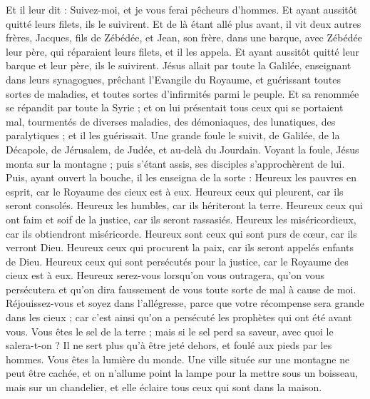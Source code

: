 \begin{multicols}{2}
Et il leur dit : Suivez-moi, et je vous ferai pêcheurs d'hommes.
Et ayant aussitôt quitté leurs filets, ils le suivirent.
Et de là étant allé plus avant, il vit deux autres frères, Jacques, fils de Zébédée, et Jean, son frère, dans une barque, avec Zébédée leur père, qui réparaient leurs filets, et il les appela.
Et ayant aussitôt quitté leur barque et leur père, ils le suivirent.
Jésus allait par toute la Galilée, enseignant dans leurs synagogues, prêchant l'Evangile du Royaume, et guérissant toutes sortes de maladies, et toutes sortes d'infirmités parmi le peuple.
Et sa renommée se répandit par toute la Syrie ; et on lui présentait tous ceux qui se portaient mal, tourmentés de diverses maladies, des démoniaques, des lunatiques, des paralytiques ; et il les guérissait.
Une grande foule le suivit, de Galilée, de la Décapole, de Jérusalem, de Judée, et au-delà du Jourdain.
\VerseOne{}Voyant la foule, Jésus monta sur la montagne ; puis s'étant assis, ses disciples s'approchèrent de lui.
Puis, ayant ouvert la bouche, il les enseigna de la sorte :
Heureux les pauvres en esprit, car le Royaume des cieux est à eux.
Heureux ceux qui pleurent, car ils seront consolés.
Heureux les humbles, car ils hériteront la terre.
Heureux ceux qui ont faim et soif de la justice, car ils seront rassasiés.
Heureux les miséricordieux, car ils obtiendront miséricorde.
Heureux sont ceux qui sont purs de cœur, car ils verront Dieu.
Heureux ceux qui procurent la paix, car ils seront appelés enfants de Dieu.
Heureux ceux qui sont persécutés pour la justice, car le Royaume des cieux est à eux.
Heureux serez-vous lorsqu'on vous outragera, qu'on vous persécutera et qu'on dira faussement de vous toute sorte de mal à cause de moi.
Réjouissez-vous et soyez dans l'allégresse, parce que votre récompense sera grande dans les cieux ; car c'est ainsi qu'on a persécuté les prophètes qui ont été avant vous.
Vous êtes le sel de la terre ; mais si le sel perd sa saveur, avec quoi le salera-t-on ? Il ne sert plus qu'à être jeté dehors, et foulé aux pieds par les hommes.
Vous êtes la lumière du monde. Une ville située sur une montagne ne peut être cachée,
et on n'allume point la lampe pour la mettre sous un boisseau, mais sur un chandelier, et elle éclaire tous ceux qui sont dans la maison.

\end{multicols}
